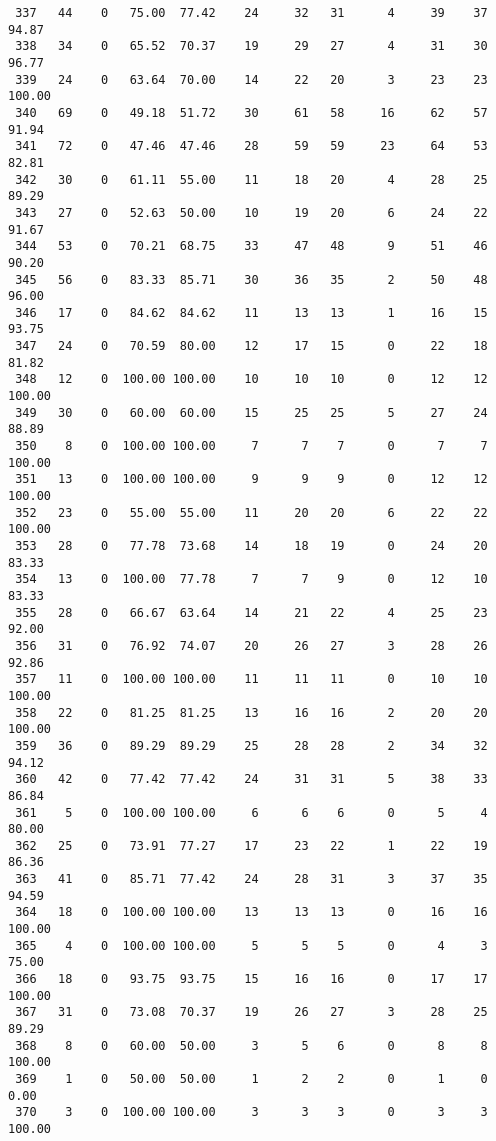 \begin{verbatim}
 337   44    0   75.00  77.42    24     32   31      4     39    37    94.87
 338   34    0   65.52  70.37    19     29   27      4     31    30    96.77
 339   24    0   63.64  70.00    14     22   20      3     23    23   100.00
 340   69    0   49.18  51.72    30     61   58     16     62    57    91.94
 341   72    0   47.46  47.46    28     59   59     23     64    53    82.81
 342   30    0   61.11  55.00    11     18   20      4     28    25    89.29
 343   27    0   52.63  50.00    10     19   20      6     24    22    91.67
 344   53    0   70.21  68.75    33     47   48      9     51    46    90.20
 345   56    0   83.33  85.71    30     36   35      2     50    48    96.00
 346   17    0   84.62  84.62    11     13   13      1     16    15    93.75
 347   24    0   70.59  80.00    12     17   15      0     22    18    81.82
 348   12    0  100.00 100.00    10     10   10      0     12    12   100.00
 349   30    0   60.00  60.00    15     25   25      5     27    24    88.89
 350    8    0  100.00 100.00     7      7    7      0      7     7   100.00
 351   13    0  100.00 100.00     9      9    9      0     12    12   100.00
 352   23    0   55.00  55.00    11     20   20      6     22    22   100.00
 353   28    0   77.78  73.68    14     18   19      0     24    20    83.33
 354   13    0  100.00  77.78     7      7    9      0     12    10    83.33
 355   28    0   66.67  63.64    14     21   22      4     25    23    92.00
 356   31    0   76.92  74.07    20     26   27      3     28    26    92.86
 357   11    0  100.00 100.00    11     11   11      0     10    10   100.00
 358   22    0   81.25  81.25    13     16   16      2     20    20   100.00
 359   36    0   89.29  89.29    25     28   28      2     34    32    94.12
 360   42    0   77.42  77.42    24     31   31      5     38    33    86.84
 361    5    0  100.00 100.00     6      6    6      0      5     4    80.00
 362   25    0   73.91  77.27    17     23   22      1     22    19    86.36
 363   41    0   85.71  77.42    24     28   31      3     37    35    94.59
 364   18    0  100.00 100.00    13     13   13      0     16    16   100.00
 365    4    0  100.00 100.00     5      5    5      0      4     3    75.00
 366   18    0   93.75  93.75    15     16   16      0     17    17   100.00
 367   31    0   73.08  70.37    19     26   27      3     28    25    89.29
 368    8    0   60.00  50.00     3      5    6      0      8     8   100.00
 369    1    0   50.00  50.00     1      2    2      0      1     0     0.00
 370    3    0  100.00 100.00     3      3    3      0      3     3   100.00

\end{verbatim}
